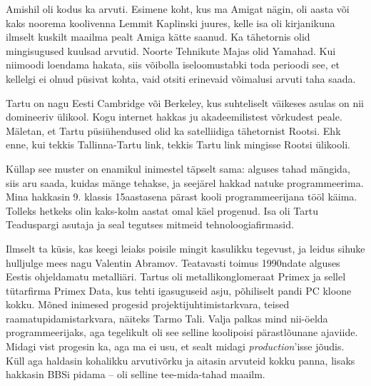 Amishil oli kodus ka arvuti. Esimene koht, kus ma Amigat nägin, oli aasta või kaks noorema 
koolivenna Lemmit Kaplinski juures, kelle isa oli
kirjanikuna ilmselt kuskilt maailma pealt Amiga kätte saanud. Ka 
tähetornis olid mingisugused kuulsad arvutid. 
Noorte Tehnikute Majas olid 
Yamahad. Kui niimoodi loendama hakata, siis võibolla 
iseloomustabki toda perioodi see, et kellelgi ei olnud püsivat kohta, vaid 
otsiti erinevaid võimalusi arvuti taha saada.


Tartu on nagu Eesti Cambridge või Berkeley, kus 
suhteliselt väikeses asulas on nii domineeriv ülikool. Kogu internet 
hakkas ju akadeemilistest võrkudest peale. Mäletan, et Tartu püsiühendused 
olid ka satelliidiga tähetornist Rootsi. 
Ehk enne, kui tekkis Tallinna-Tartu link, tekkis Tartu link mingisse Rootsi 
ülikooli. 


Küllap see muster on enamikul inimestel täpselt sama: alguses 
tahad mängida, siis aru saada, kuidas mänge tehakse, ja seejärel hakkad natuke 
programmeerima. Mina hakkasin 9. klassis 15aastasena pärast kooli 
programmeerijana tööl käima. Tolleks hetkeks olin 
kaks-kolm aastat omal käel progenud. Isa oli Tartu 
Teaduspargi asutaja ja seal tegutses 
mitmeid tehnoloogiafirmasid. 

Ilmselt ta küsis, kas keegi leiaks poisile mingit kasulikku 
tegevust, ja leidus sihuke hulljulge mees nagu Valentin 
Abramov. Teatavasti toimus 1990ndate alguses 
Eestis ohjeldamatu metalliäri. Tartus oli metallikonglomeraat 
Primex ja sellel tütarfirma Primex Data, kus 
tehti igasuguseid asju, põhiliselt pandi PC kloone kokku. Mõned inimesed progesid projektijuhtimistarkvara, teised
raamatupidamistarkvara, näiteks Tarmo 
Tali. Valja palkas mind nii-öelda programmeerijaks, 
aga tegelikult oli see selline koolipoisi pärastlõunane ajaviide. Midagi 
vist progesin ka, aga ma ei usu, et sealt midagi \emph{production}'isse 
jõudis. Küll aga haldasin kohalikku arvutivõrku ja aitasin arvuteid kokku 
panna, lisaks hakkasin BBSi pidama -- oli selline tee-mida-tahad maailm.


